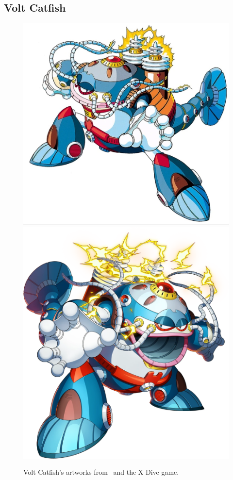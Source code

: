 \subsection{Volt Catfish}\label{boss:Volt_catfish}
\begin{figure}[htp]
	\centering
	\includegraphics[height=\portraitsize]{figures/X3/Volt_catfish/voltcatfish.png}
	\includegraphics[height=\portraitsize]{figures/X3/Volt_catfish/XVolt_Catfish.png}
	\caption{Volt Catfish's artworks from~\cite{book:MMX_Complete_art} and the X Dive game.}
\end{figure}

